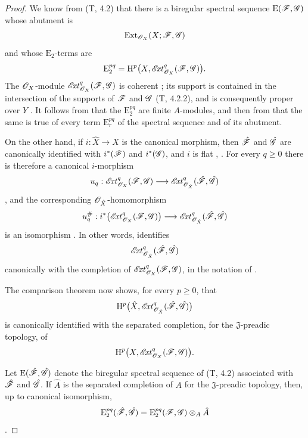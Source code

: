 \begin{proof}
We know from (T, 4.2) that there is a biregular spectral sequence
$\mathrm{E}(\mathscr{F},\mathscr{G})$ whose abutment is
\[
  \operatorname{Ext}_{\mathscr{O}_X}(X;\mathscr{F},\mathscr{G})
\]
and whose $\mathrm{E}_2$-terms are
\[
  \mathrm{E}_2^{pq}
  =\mathrm{H}^p\bigl(X,\mathscr{E}\!\mathit{xt}^q_{\mathscr{O}_X}(\mathscr{F},\mathscr{G})\bigr).
\]
The $\mathscr{O}_X$-module
$\mathscr{E}\!\mathit{xt}^q_{\mathscr{O}_X}(\mathscr{F},\mathscr{G})$ is coherent
; its support is contained in the intersection of
the supports of $\mathscr{F}$ and $\mathscr{G}$ (T, 4.2.2), and is consequently
proper over $Y$ .  It follows from
 that the $\mathrm{E}_2^{pq}$ are finite
$A$-modules, and then from  that the same is true
of every term $\mathrm{E}_r^{pq}$ of the spectral sequence and of
its abutment.

On the other hand, if $i:\hat{X}\to X$ is the canonical morphism,
then $\hat{\mathscr{F}}$ and $\hat{\mathscr{G}}$ are canonically identified
with $i^*(\mathscr{F})$ and $i^*(\mathscr{G})$, and $i$ is flat
, .  For every $q\geq0$ there
is therefore a canonical $i$-morphism
\[
  u_q:\mathscr{E}\!\mathit{xt}^q_{\mathscr{O}_X}(\mathscr{F},\mathscr{G})
  \longrightarrow
  \mathscr{E}\!\mathit{xt}^q_{\mathscr{O}_{\hat{X}}}
    (\hat{\mathscr{F}},\hat{\mathscr{G}})
\]
, and the corresponding
$\mathscr{O}_{\hat{X}}$-homomorphism
\[
  u_q^\#:
  i^*\bigl(\mathscr{E}\!\mathit{xt}^q_{\mathscr{O}_X}(\mathscr{F},\mathscr{G})\bigr)
  \longrightarrow
  \mathscr{E}\!\mathit{xt}^q_{\mathscr{O}_{\hat{X}}}
    (\hat{\mathscr{F}},\hat{\mathscr{G}})
\]
is an isomorphism .  In other words,
 identifies
\[
  \mathscr{E}\!\mathit{xt}^q_{\mathscr{O}_{\hat{X}}}
    (\hat{\mathscr{F}},\hat{\mathscr{G}})
\]
canonically with the completion of
$\mathscr{E}\!\mathit{xt}^q_{\mathscr{O}_X}(\mathscr{F},\mathscr{G})$, in the notation of
.

The comparison theorem  now shows, for every
$p\geq0$, that
\[
  \mathrm{H}^p\bigl(\hat{X},
    \mathscr{E}\!\mathit{xt}^q_{\mathscr{O}_{\hat{X}}}
      (\hat{\mathscr{F}},\hat{\mathscr{G}})\bigr)
\]
is canonically identified with the separated completion, for the
$\mathfrak J$-preadic topology, of
\[
  \mathrm{H}^p\bigl(X,\mathscr{E}\!\mathit{xt}^q_{\mathscr{O}_X}(\mathscr{F},\mathscr{G})\bigr).
\]


Let $\mathrm{E}(\hat{\mathscr{F}},\hat{\mathscr{G}})$ denote the biregular
spectral sequence of (T, 4.2) associated with $\hat{\mathscr{F}}$ and
$\hat{\mathscr{G}}$.  If $\hat{A}$ is the separated completion of $A$ for
the $\mathfrak J$-preadic topology, then, up to canonical
isomorphism,
\[
  \mathrm{E}_2^{pq}(\hat{\mathscr{F}},\hat{\mathscr{G}})
  =
  \mathrm{E}_2^{pq}(\mathscr{F},\mathscr{G})\otimes_A\hat{A}
\]
.


\end{proof}
